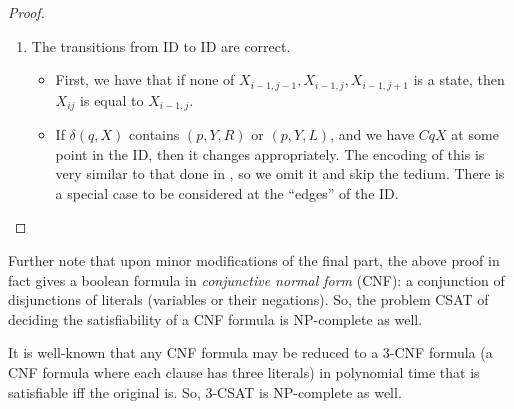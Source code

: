 \begin{proof}
\begin{enumerate}
			\item The transitions from ID to ID are correct. \\
			\begin{itemize}
				\item First, we have that if none of $X_{i-1,j-1}, X_{i-1,j}, X_{i-1,j+1}$ is a state, then $X_{ij}$ is equal to $X_{i-1,j}$.
				\item If $\delta(q,X)$ contains $(p,Y,R)$ or $(p,Y,L)$, and we have $CqX$ at some point in the ID, then it changes appropriately. The encoding of this is very similar to that done in , so we omit it and skip the tedium. There is a special case to be considered at the ``edges'' of the ID.
			\end{itemize}
		\end{enumerate}
	\end{proof}

	Further note that upon minor modifications of the final part, the above proof in fact gives a boolean formula in \emph{conjunctive normal form} (CNF): a conjunction of disjunctions of literals (variables or their negations). So, the problem \textsf{CSAT} of deciding the satisfiability of a CNF formula is \textsf{NP}-complete as well.

	It is well-known that any CNF formula may be reduced to a 3-CNF formula (a CNF formula where each clause has three literals) in polynomial time that is satisfiable iff the original is. So, 3-\textsf{CSAT} is \textsf{NP}-complete as well.